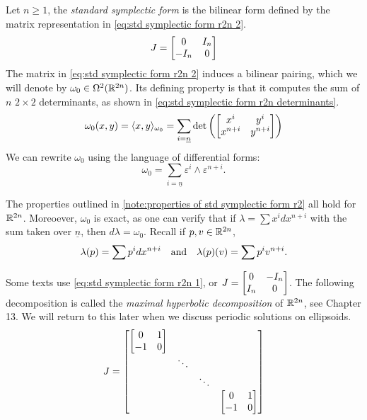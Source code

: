 \documentclass[../main-v2-manifolds.tex]{subfiles}
\begin{document}
\begin{definition}\label{def:std-symplectic-form}
    Let $n\geq 1$, the \emph{standard symplectic form} is the bilinear form defined by the matrix representation in \cref{eq:std symplectic form r2n 2}.
    \begin{equation}
        J =\begin{bmatrix}
            \admat[0]{I_n,-I_n}
        \end{bmatrix}
        \label{eq:std symplectic form r2n 2}
    \end{equation}
    The matrix in \cref{eq:std symplectic form r2n 2} induces a bilinear pairing, which we will denote by $\omega_0\in \Omega^2({\mathbb{R}^{2n}})$. Its defining property is that it computes the sum of $n$ $2\times 2$ determinants, as shown in \cref{eq:std symplectic form r2n determinants}. 
    \begin{equation}
        \omega_0(x,y) =\langle x,y\rangle_{\omega_0} = \sum_{i=\underline{n}}\det\qty(\mqty[x^i & y^i \\ x^{n+i} & y^{n+i}])
        \label{eq:std symplectic form r2n determinants}
    \end{equation}
    We can rewrite $\omega_0$ using the language of differential forms:
    \begin{equation}
        \omega_0 = \sum_{i=\underline{n}}\varepsilon^{i}\wedge\varepsilon^{n+i}.
        \label{eq: std symplectic form r2n wedge products using covectors}
    \end{equation}
\end{definition}
The properties outlined in \cref{note:properties of std symplectic form r2} all hold for ${\mathbb{R}^{2n}}$. Moreoever, $\omega_0$ is exact, as one can verify that if $\lambda = \sum x^i dx^{n+i}$ with the sum taken over $\underline{n}$, then $d\lambda = \omega_0$. Recall if $p,v\in{\mathbb{R}^{2n}}$, 
\[
    \lambda(p) = \sum p^{i}dx^{n+i}\qqtext{and} \lambda(p)(v) = \sum p^{i}v^{n+i}.
\]
%
\begin{remark}
    Some texts use \cref{eq:std symplectic form r2n 1}, or $J = \mqty[0 & -I_n\\ I_n & 0]$. The following decomposition is called the \emph{maximal hyperbolic decomposition} of ${\mathbb{R}^{2n}}$, see \cite{Roman2007Advanced} Chapter 13. We will return to this later when we discuss periodic solutions on ellipsoids.
    \begin{equation}
    J = \begin{bmatrix}
        \dmat{\symatrix,\ddots,\ddots,\symatrix}
    \end{bmatrix}
    \label{eq:std symplectic form r2n 1}
\end{equation}
\end{remark}
\end{document}
